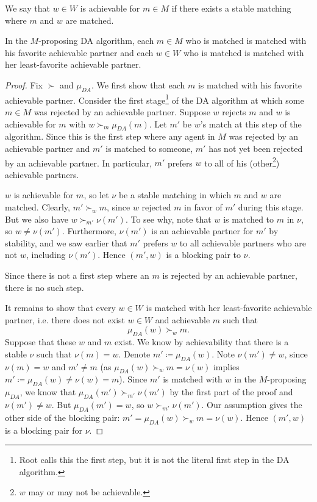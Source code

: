 \begin{definition}[Achievable]
	We say that $w \in W$ is achievable for $m \in M$ if there exists a stable matching where $m$ and $w$ are matched.
\end{definition}

\begin{proposition}
	In the $M$-proposing DA algorithm, each $m \in M$ who is matched is matched with his favorite achievable partner and each $w \in W$ who is matched is matched with her least-favorite achievable partner.
\end{proposition}

\begin{proof}
	Fix $\succ$ and $\mu_{DA}$. We first show that each $m$ is matched with his favorite achievable partner.
	Consider the first stage\footnote{Root calls this the first step, but it is not the literal first step in the DA algorithm.} of the DA algorithm at which some $m \in M$ was rejected by an achievable partner.
	Suppose $w$ rejects $m$ and $w$ is achievable for $m$ with $w \succ_m \mu_{DA}(m)$. Let $m'$ be $w$'s match at this step of the algorithm. Since this is the first step where any agent in $M$ was rejected by an achievable partner and $m'$ is matched to someone, $m'$ has not yet been rejected by an achievable partner. In particular, $m'$ prefers $w$ to all of his (other\footnote{$w$ may or may not be achievable.}) achievable partners.

	$w$ is achievable for $m$, so let $\nu$ be a stable matching in which $m$ and $w$ are matched. Clearly, $m' \succ_w m$, since $w$ rejected $m$ in favor of $m'$ during this stage.
	But we also have $w \succ_{m'} \nu(m')$. To see why, note that $w$ is matched to $m$ in $\nu$, so $w \ne \nu(m')$. Furthermore, $\nu(m')$ is an achievable partner for $m'$ by stability, and we saw earlier that $m'$ prefers $w$ to all achievable partners who are not $w$, including $\nu(m')$. Hence $(m',w)$ is a blocking pair to $\nu$.

	Since there is not a first step where an $m$ is rejected by an achievable partner, there is no such step.

	It remains to show that every $w \in W$ is matched with her least-favorite achievable partner, i.e. there does not exist $w \in W$ and achievable $m$ such that \[
		\mu_{DA}(w) \succ_w m
	.\] 
	Suppose that these $w$ and $m$ exist. We know by achievability that there is a stable $\nu$ such that $\nu(m) = w$.
	Denote $m' \coloneqq \mu_{DA}(w)$. Note $\nu(m') \ne w$, since $\nu(m) = w$ and $m' \ne m$ (as $\mu_{DA}(w) \succ_w m = \nu(w)$ implies $m' \coloneqq \mu_{DA}(w) \ne \nu(w) = m$). Since $m'$ is matched with $w$ in the $M$-proposing $\mu_{DA}$, we know that $\mu_{DA}(m') \succ_{m'} \nu(m')$ by the first part of the proof and $\nu(m') \ne w$.
	But $\mu_{DA}(m') = w$, so $w \succ_{m'} \nu(m')$. Our assumption gives the other side of the blocking pair: $m' = \mu_{DA}(w) \succ_w m = \nu(w)$. Hence $(m',w)$ is a blocking pair for $\nu$.
\end{proof}


